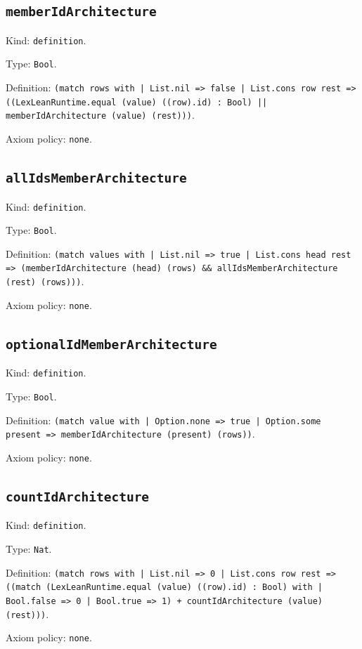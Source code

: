 \documentclass[11pt]{article}
\begin{document}
\subsection*{\texttt{memberIdArchitecture}}
\noindent Kind: \texttt{definition}.\par
\noindent Type: \texttt{Bool}.\par
\noindent Definition: \texttt{(match rows with | List.nil => false | List.cons row rest => ((LexLeanRuntime.equal (value) ((row).id) : Bool) || memberIdArchitecture (value) (rest)))}.\par
\noindent Axiom policy: \texttt{none}.\par
\subsection*{\texttt{allIdsMemberArchitecture}}
\noindent Kind: \texttt{definition}.\par
\noindent Type: \texttt{Bool}.\par
\noindent Definition: \texttt{(match values with | List.nil => true | List.cons head rest => (memberIdArchitecture (head) (rows) \&\& allIdsMemberArchitecture (rest) (rows)))}.\par
\noindent Axiom policy: \texttt{none}.\par
\subsection*{\texttt{optionalIdMemberArchitecture}}
\noindent Kind: \texttt{definition}.\par
\noindent Type: \texttt{Bool}.\par
\noindent Definition: \texttt{(match value with | Option.none => true | Option.some present => memberIdArchitecture (present) (rows))}.\par
\noindent Axiom policy: \texttt{none}.\par
\subsection*{\texttt{countIdArchitecture}}
\noindent Kind: \texttt{definition}.\par
\noindent Type: \texttt{Nat}.\par
\noindent Definition: \texttt{(match rows with | List.nil => 0 | List.cons row rest => ((match (LexLeanRuntime.equal (value) ((row).id) : Bool) with | Bool.false => 0 | Bool.true => 1) + countIdArchitecture (value) (rest)))}.\par
\noindent Axiom policy: \texttt{none}.\par
\end{document}
